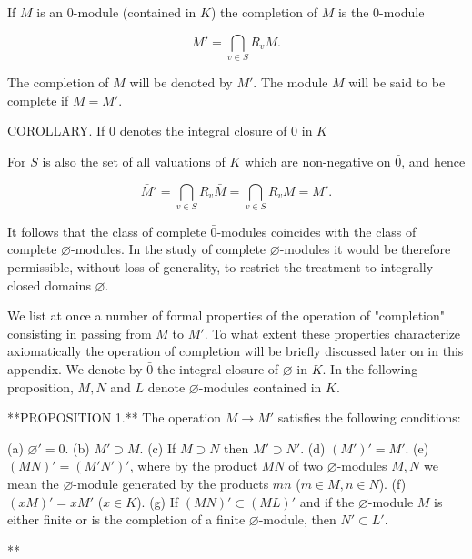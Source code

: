 If $M$ is an $0$-module (contained in $K$) the completion of $M$ is the $0$-module

$$M' = \bigcap_{v \in S} R_v M.$$

The completion of $M$ will be denoted by $M'$. The module $M$ will be said to be complete if $M = M'$.

COROLLARY. If $0$ denotes the integral closure of $0$ in $K$

For $S$ is also the set of all valuations of $K$ which are non-negative on $\bar{0}$, and hence

$$\bar{M}' = \bigcap_{v \in S} R_v \bar{M} = \bigcap_{v \in S} R_v M = M'.$$

It follows that the class of complete $\bar{0}$-modules coincides with the class of complete $\varnothing$-modules. In the study of complete $\varnothing$-modules it would be therefore permissible, without loss of generality, to restrict the treatment to integrally closed domains $\varnothing$.

We list at once a number of formal properties of the operation of "completion" consisting in passing from $M$ to $M'$. To what extent these properties characterize axiomatically the operation of completion will be briefly discussed later on in this appendix. We denote by $\bar{0}$ the integral closure of $\varnothing$ in $K$. In the following proposition, $M, N$ and $L$ denote $\varnothing$-modules contained in $K$.

**PROPOSITION 1.** The operation $M \rightarrow M'$ satisfies the following conditions:

(a) $\varnothing' = \bar{0}$.
(b) $M' \supset M$.
(c) If $M \supset N$ then $M' \supset N'$.
(d) $(M')' = M'$.
(e) $(MN)' = (M'N')'$, where by the product $MN$ of two $\varnothing$-modules $M, N$ we mean the $\varnothing$-module generated by the products $mn$ ($m \in M, n \in N$).
(f) $(xM)' = xM'$ ($x \in K$).
(g) If $(MN)' \subset (ML)'$ and if the $\varnothing$-module $M$ is either finite or is the completion of a finite $\varnothing$-module, then $N' \subset L'$.

**
